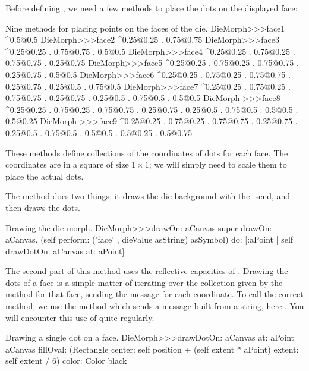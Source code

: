 \documentclass[a4paper,10pt,twoside]{book}
\begin{document}
Before defining , we need a few methods to place the dots on the displayed face:
\begin{methods}{Nine methods for placing points on the faces of the die.}
DieMorph>>>face1
	^{0.5@0.5}
DieMorph>>>face2
	^{0.25@0.25 . 0.75@0.75}
DieMorph>>>face3
	^{0.25@0.25 . 0.75@0.75 . 0.5@0.5}
DieMorph>>>face4
	^{0.25@0.25 . 0.75@0.25 . 0.75@0.75 . 0.25@0.75}
DieMorph>>>face5
	^{0.25@0.25 . 0.75@0.25 . 0.75@0.75 . 0.25@0.75 . 0.5@0.5}
DieMorph>>>face6
	^{0.25@0.25 . 0.75@0.25 . 0.75@0.75 . 0.25@0.75 . 0.25@0.5 . 0.75@0.5}
DieMorph>>>face7
	^{0.25@0.25 . 0.75@0.25 . 0.75@0.75 . 0.25@0.75 . 0.25@0.5 . 0.75@0.5 . 0.5@0.5}
DieMorph >>>face8
	^{0.25@0.25 . 0.75@0.25 . 0.75@0.75 . 0.25@0.75 . 0.25@0.5 . 0.75@0.5 . 0.5@0.5 . 0.5@0.25}
DieMorph >>>face9
	^{0.25@0.25 . 0.75@0.25 . 0.75@0.75 . 0.25@0.75 . 0.25@0.5 . 0.75@0.5 . 0.5@0.5 . 0.5@0.25 . 0.5@0.75}
\end{methods}

These methods define collections of the coordinates of dots for each face. The coordinates are in a square of size $1\times1$; we will simply need to scale them to place the actual dots.

The  method does two things: it draws the die background with the -send, and then draws the dots.
\begin{method}{Drawing the die morph.}
DieMorph>>>drawOn: aCanvas
	super drawOn: aCanvas.
	(self perform: ('face' , dieValue asString) asSymbol)
		do: [:aPoint | self drawDotOn: aCanvas at: aPoint]
\end{method}

The second part of this method uses the reflective capacities of \st.
Drawing the dots of a face is a simple matter of iterating over the collection given by the  method for that face, sending the  message for each coordinate. To call the correct  method, we use the  method which sends a message built from a string, here . You will encounter this use of  quite regularly.
\begin{method}{Drawing a single dot on a face.}
DieMorph>>>drawDotOn: aCanvas at: aPoint
	aCanvas
		fillOval: (Rectangle
			center: self position + (self extent * aPoint)
			extent: self extent / 6)
		color: Color black
\end{method}
\end{document}
